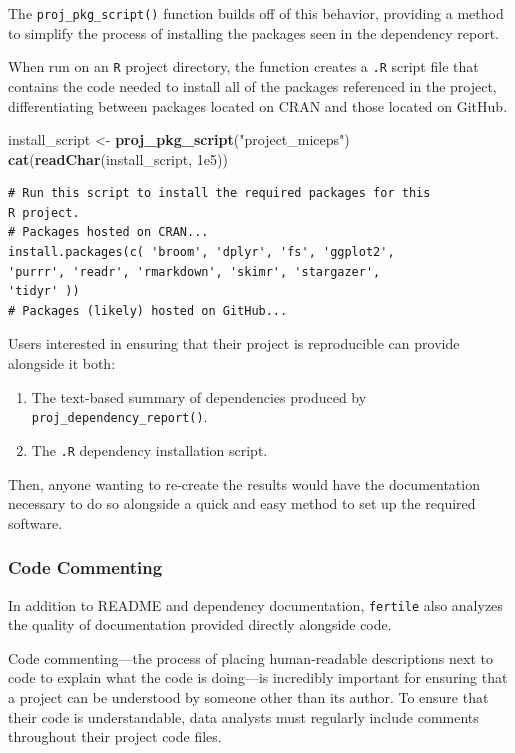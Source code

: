 \documentclass[12pt,twoside]{reedthesis}
\newenvironment{Shaded}{\begin{snugshade}}{\end{snugshade}}
\newcommand{\FloatTok}[1]{\textcolor[rgb]{0.00,0.00,0.81}{#1}}
\newcommand{\KeywordTok}[1]{\textcolor[rgb]{0.13,0.29,0.53}{\textbf{#1}}}
\newcommand{\NormalTok}[1]{#1}
\newcommand{\StringTok}[1]{\textcolor[rgb]{0.31,0.60,0.02}{#1}}
\providecommand{\tightlist}{%
  \setlength{\itemsep}{0pt}\setlength{\parskip}{0pt}}
\begin{document}
The \texttt{proj\_pkg\_script()} function builds off of this behavior, providing a method to simplify the process of installing the packages seen in the dependency report.

When run on an \texttt{R} project directory, the function creates a \texttt{.R} script file that contains the code needed to install all of the packages referenced in the project, differentiating between packages located on CRAN and those located on GitHub.
\begin{Shaded}
\begin{Highlighting}[]
\NormalTok{install_script <-}\StringTok{ }\KeywordTok{proj_pkg_script}\NormalTok{(}\StringTok{"project_miceps"}\NormalTok{)}
\KeywordTok{cat}\NormalTok{(}\KeywordTok{readChar}\NormalTok{(install_script, }\FloatTok{1e5}\NormalTok{))}
\end{Highlighting}
\end{Shaded}
\begin{verbatim}
# Run this script to install the required packages for this
R project.
# Packages hosted on CRAN...
install.packages(c( 'broom', 'dplyr', 'fs', 'ggplot2',
'purrr', 'readr', 'rmarkdown', 'skimr', 'stargazer',
'tidyr' ))
# Packages (likely) hosted on GitHub...
\end{verbatim}
Users interested in ensuring that their project is reproducible can provide alongside it both:
\begin{enumerate}
\def\labelenumi{\arabic{enumi}.}
\tightlist
\item
  The text-based summary of dependencies produced by \texttt{proj\_dependency\_report()}.
\item
  The \texttt{.R} dependency installation script.
\end{enumerate}
Then, anyone wanting to re-create the results would have the documentation necessary to do so alongside a quick and easy method to set up the required software.

\hypertarget{code-commenting}{%
\subsubsection{Code Commenting}\label{code-commenting}}

In addition to README and dependency documentation, \texttt{fertile} also analyzes the quality of documentation provided directly alongside code.

Code commenting---the process of placing human-readable descriptions next to code to explain what the code is doing---is incredibly important for ensuring that a project can be understood by someone other than its author. To ensure that their code is understandable, data analysts must regularly include comments throughout their project code files.
\end{document}
